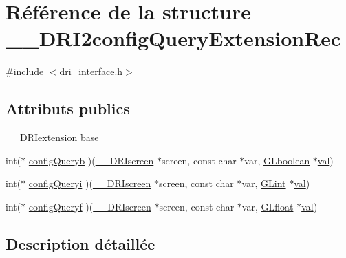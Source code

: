 \hypertarget{struct_____d_r_i2config_query_extension_rec}{\section{Référence de la structure \-\_\-\-\_\-\-D\-R\-I2config\-Query\-Extension\-Rec}
\label{struct_____d_r_i2config_query_extension_rec}
}


{\ttfamily \#include $<$dri\-\_\-interface.\-h$>$}

\subsection*{Attributs publics}
\begin{DoxyCompactItemize}
\item 
\hyperlink{dri__interface_8h_a4e0a61c8ece00d2b2c6792a9a1b55385}{\-\_\-\-\_\-\-D\-R\-Iextension} \hyperlink{struct_____d_r_i2config_query_extension_rec_a1034a62a113739a223fd6d57a5294564}{base}
\item 
int($\ast$ \hyperlink{struct_____d_r_i2config_query_extension_rec_ac7614ec002c335e3b9bbf35d2057f239}{config\-Queryb} )(\hyperlink{dri__interface_8h_a9961b01d421ee1fd6ed3c05acc9ca561}{\-\_\-\-\_\-\-D\-R\-Iscreen} $\ast$screen, const char $\ast$var, \hyperlink{gl_8h_aea1419aa8aec5854bd9807b45171029d}{G\-Lboolean} $\ast$\hyperlink{glext_8h_a9f7dd2b9d60b1323394c63267ac42ce1}{val})
\item 
int($\ast$ \hyperlink{struct_____d_r_i2config_query_extension_rec_a71a4045f75a88a2b648a63b942970414}{config\-Queryi} )(\hyperlink{dri__interface_8h_a9961b01d421ee1fd6ed3c05acc9ca561}{\-\_\-\-\_\-\-D\-R\-Iscreen} $\ast$screen, const char $\ast$var, \hyperlink{gl_8h_acebcc1c5663f14ebde1d16831e5fed94}{G\-Lint} $\ast$\hyperlink{glext_8h_a9f7dd2b9d60b1323394c63267ac42ce1}{val})
\item 
int($\ast$ \hyperlink{struct_____d_r_i2config_query_extension_rec_a08e40806457fda19b143308d525c7cc1}{config\-Queryf} )(\hyperlink{dri__interface_8h_a9961b01d421ee1fd6ed3c05acc9ca561}{\-\_\-\-\_\-\-D\-R\-Iscreen} $\ast$screen, const char $\ast$var, \hyperlink{gl_8h_a31aeedaeef29442c9c015ab355c8f5ab}{G\-Lfloat} $\ast$\hyperlink{glext_8h_a9f7dd2b9d60b1323394c63267ac42ce1}{val})
\end{DoxyCompactItemize}


\subsection{Description détaillée}


